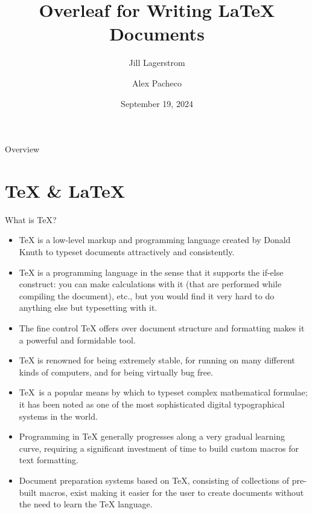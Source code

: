 \documentclass[style=njit,orient=landscape]{powerdot}
\title{Overleaf for Writing \LaTeX{} Documents}
\author{Jill Lagerstrom \and Alex Pacheco}
\date{September 19, 2024}
\begin{document}
\maketitle
\begin{wideslide}[toc=,bm=]{Overview}
  \tableofcontents[content=sections]
\end{wideslide}
\scriptsize

\section[slide=false]{\TeX{} \& \LaTeX{}}
\begin{slide}[bm={What is \TeX{} \& \LaTeX?}]{What is \TeX{}?}
  \begin{itemize}
  \item \TeX{} is a low-level markup and programming language created by Donald Knuth to typeset documents attractively and consistently.
  \item \TeX{} is a programming language in the sense that it supports the if-else construct: you can make calculations with it (that are performed while compiling the document), etc., but you would find it very hard to do anything else but typesetting with it.
  \item The fine control \TeX{} offers over document structure and formatting makes it a powerful and formidable tool.
  \item \TeX{} is renowned for being extremely stable, for running on many different kinds of computers, and for being virtually bug free.
  \item \TeX\, is a popular means by which to typeset complex mathematical formulae; it has been noted as one of the most sophisticated digital typographical systems in the world.
  \item Programming in \TeX{} generally progresses along a very gradual learning curve, requiring a significant investment of time to build custom macros for text formatting.
  \item Document preparation systems based on \TeX{}, consisting of collections of pre-built macros, exist making it easier for the user to create documents without the need to learn the \TeX{} language.
  \end{itemize}
\end{slide}	
\end{document}

